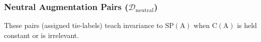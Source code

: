 \subsubsection{Neutral Augmentation Pairs (\texorpdfstring{$\mathcal{D}_{\mathrm{neutral}}$}{D-neutral})}
These pairs (assigned tie-labels) teach invariance to $\mathrm{SP}(\mathrm{A})$ when $\mathrm{C}(\mathrm{A})$ is held constant or is irrelevant.









